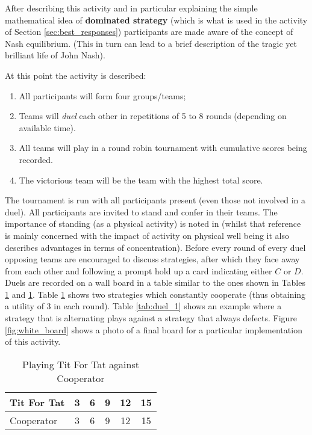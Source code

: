 \documentclass[12pt, a4paper]{article}
\begin{document}
After describing this activity and in particular explaining the simple
mathematical idea of \textbf{dominated strategy} (which is what is used in the
activity of Section \ref{sec:best_responses}) participants are made aware of the
concept of Nash equilibrium. (This in turn can lead to a brief description of the
tragic yet brilliant life of John Nash).

At this point the activity is described:

\begin{enumerate}
    \item All participants will form four groups/teams;
    \item Teams will \textit{duel} each other in repetitions of 5 to 8 rounds
        (depending on available time).
    \item All teams will play in a round robin tournament with cumulative scores
        being recorded.
    \item The victorious team will be the team with the highest total score.
\end{enumerate}

The tournament is run with all participants present (even those not involved in
a duel).  All participants are invited to stand and confer in their teams. The
importance of standing (as a physical activity) is noted in \cite{Donnelly2011}
(whilst that reference is mainly concerned with the impact of activity on
physical well being it also describes advantages in terms of concentration).
Before every round of every duel opposing teams are encouraged to discuss
strategies, after which they face away from each other and following a prompt
hold up a card indicating either \(C\) or \(D\).  Duels are recorded on a wall
board in a table similar to the ones shown in Tables \ref{tab:duel} and
\ref{tab:duel}.  Table \ref{tab:duel} shows two strategies which constantly
cooperate (thus obtaining a utility of 3 in each round). Table \ref{tab:duel_1}
shows an example where a strategy that is alternating plays against a strategy
that always defects.  Figure \ref{fig:white_board} shows a photo of a final
board for a particular implementation of this activity.

\begin{table}[!htbp]
    \caption{Playing Tit For Tat against Cooperator}
    \centering
    \begin{tabular}{lccccc}
        \toprule
        Tit For Tat&3&6&9&12&15\\
        \midrule
        Cooperator&3&6&9&12&15\\
        \bottomrule
    \end{tabular}
    \label{tab:duel}
\end{table}
\end{document}
